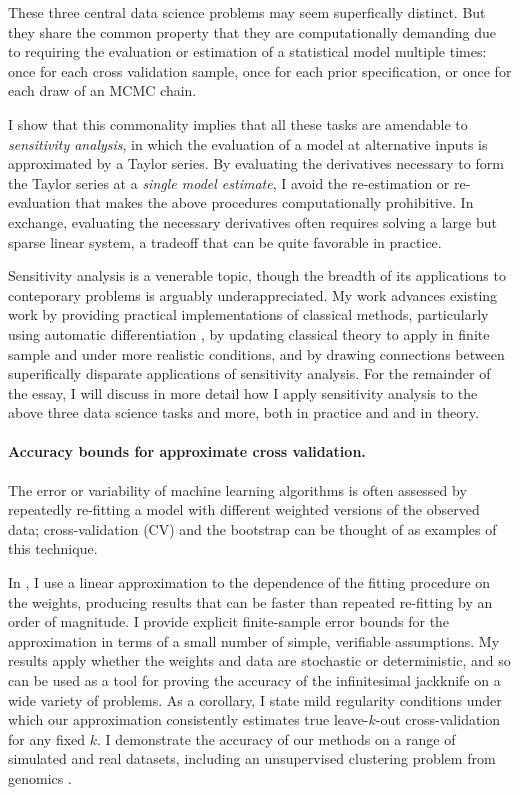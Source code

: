 These three central data science problems may seem superfically distinct.  But
they share the common property that they are computationally demanding due to
requiring the evaluation or estimation of a statistical model multiple times:
once for each cross validation sample, once for each prior specification, or
once for each draw of an MCMC chain.

I show that this commonality implies that all these tasks are amendable to {\em
sensitivity analysis}, in which the evaluation of a model at alternative inputs
is approximated by a Taylor series.  By evaluating the derivatives necessary to
form the Taylor series at a {\em single model estimate}, I avoid the
re-estimation or re-evaluation that makes the above procedures computationally
prohibitive.  In exchange, evaluating the necessary derivatives often requires
solving a large but sparse linear system, a tradeoff that can be quite favorable
in practice.

Sensitivity analysis is a venerable topic, though the breadth of its
applications to conteporary problems is arguably underappreciated.  My work
advances existing work by providing practical implementations of classical
methods, particularly using automatic differentiation
\citep{baydin:2015:automatic}, by updating classical theory to apply in finite
sample and under more realistic conditions, and by drawing connections between
superifically disparate applications of sensitivity analysis. For the remainder
of the essay, I will discuss in more detail how I apply sensitivity analysis to
the above three data science tasks and more, both in practice and and in theory.




\newpage

\paragraph{Accuracy bounds for approximate cross validation.}

The error or variability of machine learning algorithms is often assessed by
repeatedly re-fitting a model with different weighted versions of the observed
data; cross-validation (CV) and the bootstrap can be thought of as examples of
this technique.

In \citet{giordano:2019:ij}, I use a linear approximation to the
dependence of the fitting procedure on the weights, producing results that can
be faster than repeated re-fitting by an order of magnitude. I provide explicit
finite-sample error bounds for the approximation in terms of a small number of
simple, verifiable assumptions.  My results apply whether the weights and data
are stochastic or deterministic, and so can be used as a tool for proving the
accuracy of the infinitesimal jackknife on a wide variety of problems. As a
corollary, I state mild regularity conditions under which our approximation
consistently estimates true leave-$k$-out cross-validation for any fixed $k$. I
demonstrate the accuracy of our methods on a range of simulated and real
datasets, including an unsupervised clustering problem from genomics
\citep{Luan:2003:clustering, shoemaker:2015:ultrasensitive}.


